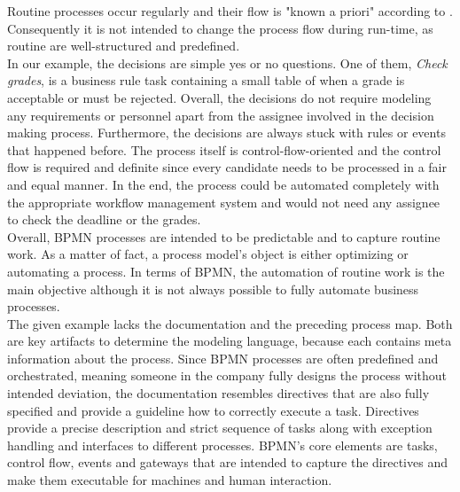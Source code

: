 Routine processes occur regularly and their flow is "known a priori" according to \cite{Zeising_2014}. Consequently it is not intended to change the process flow during run-time, as routine are well-structured and predefined.\\
In our example, the decisions are simple yes or no questions. One of them, \textit{Check grades}, is a business rule task containing a small table of when a grade is acceptable or must be rejected. Overall, the decisions do not require modeling any requirements or personnel apart from the assignee involved in the decision making process. Furthermore, the decisions are always stuck with rules or events that happened before. The process itself is control-flow-oriented and the control flow is required and definite since every candidate needs to be processed in a fair and equal manner. In the end, the process could be automated completely with the appropriate workflow management system and would not need any assignee to check the deadline or the grades. \\
Overall, BPMN processes are intended to be predictable and to capture routine work. As a matter of fact, a process model's object is either optimizing or automating a process. In terms of BPMN, the automation of routine work is the main objective although it is not always possible to fully automate business processes. \\
The given example lacks the documentation and the preceding process map. Both are key artifacts to determine the modeling language, because each contains meta information about the process. Since BPMN processes are often predefined and orchestrated, meaning someone in the company fully designs the process without intended deviation, the documentation resembles directives that are also fully specified and provide a guideline how to correctly execute a task. Directives provide a precise description and strict sequence of tasks along with exception handling and interfaces to different processes. BPMN's core elements are tasks, control flow, events and gateways that are intended to capture the directives and make them executable for machines and human interaction. \\
